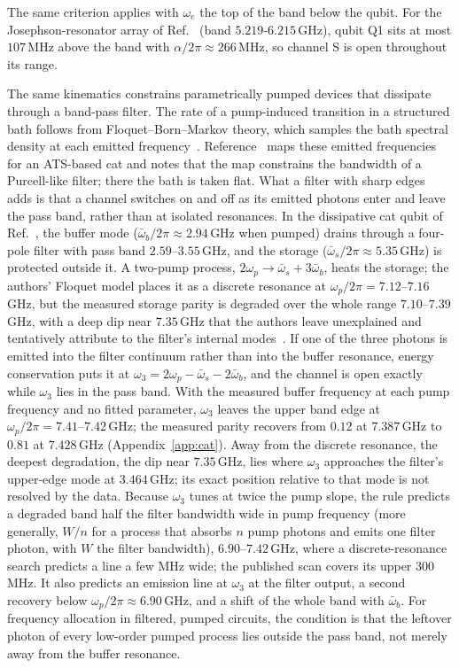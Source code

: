 \documentclass[aps,prresearch,twocolumn,superscriptaddress,nofootinbib,longbibliography,floatfix]{revtex4-2}
\begin{document}
The same criterion applies with $\omega_e$ the top of the band below the qubit. For the
Josephson-resonator array of Ref.~\cite{Scigliuzzo2022} (band $5.219$-$6.215$\,GHz), qubit Q1 sits at most $107$\,MHz
above the band with $\alpha/2\pi\approx266$\,MHz, so channel S is open throughout its range.

The same kinematics constrains parametrically pumped devices that dissipate through a band-pass filter. The rate of a
pump-induced transition in a structured bath follows from Floquet--Born--Markov theory, which samples the bath spectral
density at each emitted frequency~\cite{Carde2024,BenhayouneKhadraoui2025}. Reference~\cite{Carde2024} maps these
emitted frequencies for an ATS-based cat and notes that the map constrains the bandwidth of a Purcell-like filter; there the
bath is taken flat. What a filter with sharp edges adds is that a
channel switches on and off as its emitted photons enter and leave the pass band, rather than at isolated resonances.
In the dissipative cat qubit of Ref.~\cite{Putterman2025}, the buffer mode ($\bar\omega_b/2\pi\approx2.94$\,GHz when
pumped) drains through a four-pole filter with pass band $2.59$--$3.55$\,GHz, and the storage
($\bar\omega_s/2\pi\approx5.35$\,GHz) is protected outside it. A two-pump process, $2\omega_p\to\bar\omega_s+3\bar\omega_b$,
heats the storage; the authors' Floquet model places it as a discrete resonance at $\omega_p/2\pi=7.12$--$7.16$\,GHz, but the
measured storage parity is degraded over the whole range $7.10$--$7.39$\,GHz, with a deep dip near $7.35$\,GHz that the
authors leave unexplained and tentatively attribute to the filter's internal modes~\cite{Putterman2025}. If one of the
three photons is emitted into the filter continuum rather than into the buffer resonance, energy conservation puts it at
$\omega_3=2\omega_p-\bar\omega_s-2\bar\omega_b$, and the channel is open exactly while $\omega_3$ lies in the pass band.
With the measured buffer frequency at each pump frequency and no fitted parameter, $\omega_3$ leaves the upper band edge
at $\omega_p/2\pi=7.41$--$7.42$\,GHz; the measured parity recovers from $0.12$ at $7.387$\,GHz to $0.81$ at $7.428$\,GHz
(Appendix~\ref{app:cat}). Away from the discrete resonance, the deepest degradation, the dip near $7.35$\,GHz, lies
where $\omega_3$ approaches the filter's upper-edge mode at $3.464$\,GHz; its exact position relative to that mode is not
resolved by the data. Because $\omega_3$ tunes at twice the pump slope, the rule predicts a degraded band half the filter
bandwidth wide in pump frequency (more generally, $W/n$ for a process that absorbs $n$ pump photons and emits one filter
photon, with $W$ the filter bandwidth), $6.90$--$7.42$\,GHz, where a discrete-resonance search predicts a line a few MHz wide;
the published scan covers its upper $300$\,MHz. It also predicts an emission line at $\omega_3$ at the filter output, a
second recovery below $\omega_p/2\pi\approx6.90$\,GHz, and a shift of the whole band with $\bar\omega_b$. For frequency allocation in filtered, pumped circuits, the condition is that the leftover photon of every
low-order pumped process lies outside the pass band, not merely away from the buffer resonance.
\end{document}
